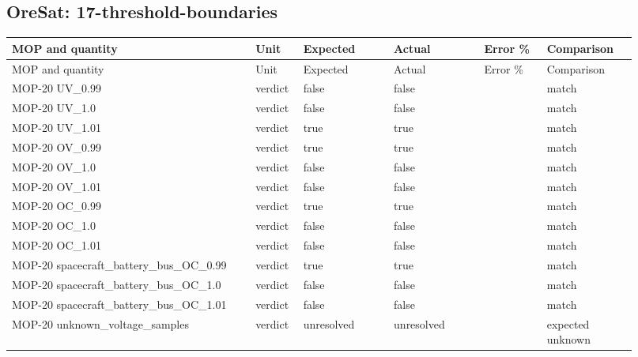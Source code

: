 \subsection{OreSat: 17-threshold-boundaries}

\begingroup\scriptsize\setlength{\tabcolsep}{2pt}\setlength{\parskip}{0pt}
\begin{longtable}{@{}>{\raggedright\arraybackslash}p{0.3588\linewidth} >{\raggedright\arraybackslash}p{0.0552\linewidth} >{\raggedright\arraybackslash}p{0.138\linewidth} >{\raggedright\arraybackslash}p{0.138\linewidth} >{\raggedright\arraybackslash}p{0.09200000000000001\linewidth} >{\raggedright\arraybackslash}p{0.138\linewidth}@{}}
\toprule
MOP and quantity & Unit & Expected & Actual & Error \% & Comparison \\ \midrule
\endfirsthead
\toprule
MOP and quantity & Unit & Expected & Actual & Error \% & Comparison \\ \midrule
\endhead
\bottomrule\endfoot
MOP-20 UV\_\allowbreak{}0.99 & verdict & false & false &  & match \\
MOP-20 UV\_\allowbreak{}1.0 & verdict & false & false &  & match \\
MOP-20 UV\_\allowbreak{}1.01 & verdict & true & true &  & match \\
MOP-20 OV\_\allowbreak{}0.99 & verdict & true & true &  & match \\
MOP-20 OV\_\allowbreak{}1.0 & verdict & false & false &  & match \\
MOP-20 OV\_\allowbreak{}1.01 & verdict & false & false &  & match \\
MOP-20 OC\_\allowbreak{}0.99 & verdict & true & true &  & match \\
MOP-20 OC\_\allowbreak{}1.0 & verdict & false & false &  & match \\
MOP-20 OC\_\allowbreak{}1.01 & verdict & false & false &  & match \\
MOP-20 spacecraft\_\allowbreak{}battery\_\allowbreak{}bus\_\allowbreak{}OC\_\allowbreak{}0.99 & verdict & true & true &  & match \\
MOP-20 spacecraft\_\allowbreak{}battery\_\allowbreak{}bus\_\allowbreak{}OC\_\allowbreak{}1.0 & verdict & false & false &  & match \\
MOP-20 spacecraft\_\allowbreak{}battery\_\allowbreak{}bus\_\allowbreak{}OC\_\allowbreak{}1.01 & verdict & false & false &  & match \\
MOP-20 unknown\_\allowbreak{}voltage\_\allowbreak{}samples & verdict & unresolved & unresolved &  & expected unknown \\

\end{longtable}
